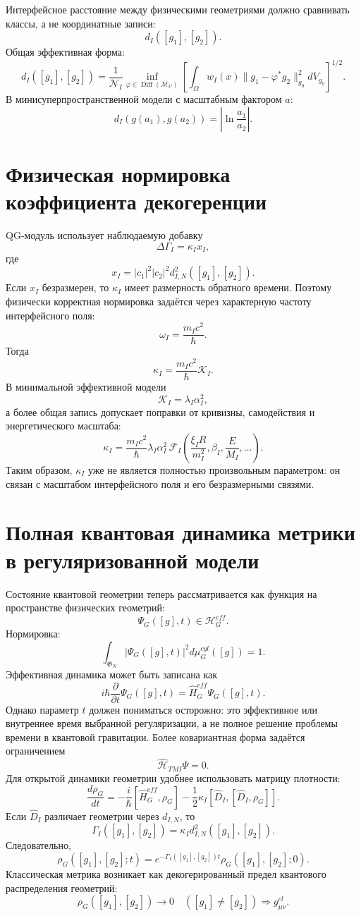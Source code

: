 \documentclass[12pt,a4paper]{article}
\DeclareMathOperator{\Diff}{Diff}
\newcommand{\M}{\mathcal M_U}
\newcommand{\Hilb}{\mathcal H}
\newcommand{\gfrak}{\mathfrak G}
\begin{document}
Интерфейсное расстояние между физическими геометриями должно сравнивать классы, а не координатные записи:
\[
\boxed{d_I([g_1],[g_2]).}
\]
Общая эффективная форма:
\[
\boxed{
d_I([g_1],[g_2])=\frac{1}{\mathcal N_I}\inf_{\varphi\in\Diff(\M)}
\left[\int_\Omega w_I(x)\|g_1-\varphi^*g_2\|_{g_0}^2dV_{g_0}\right]^{1/2}.
}
\]
В минисуперпространственной модели с масштабным фактором $a$:
\[
\boxed{d_I(g(a_1),g(a_2))=\left|\ln\frac{a_1}{a_2}\right|.}
\]

\section{Физическая нормировка коэффициента декогеренции}
QG-модуль использует наблюдаемую добавку
\[
\boxed{\Delta\Gamma_I=\kappa_I x_I,}
\]
где
\[
\boxed{x_I=|c_1|^2|c_2|^2d_{I,N}^2([g_1],[g_2]).}
\]
Если $x_I$ безразмерен, то $\kappa_I$ имеет размерность обратного времени. Поэтому физически корректная нормировка задаётся через характерную частоту интерфейсного поля:
\[
\boxed{\omega_I=\frac{m_Ic^2}{\hbar}.}
\]
Тогда
\[
\boxed{\kappa_I=\frac{m_Ic^2}{\hbar}\mathcal K_I.}
\]
В минимальной эффективной модели
\[
\boxed{\mathcal K_I=\lambda_I\alpha_I^2,}
\]
а более общая запись допускает поправки от кривизны, самодействия и энергетического масштаба:
\[
\boxed{
\kappa_I=\frac{m_Ic^2}{\hbar}\lambda_I\alpha_I^2\,
\mathcal F_I\left(\frac{\xi_I R}{m_I^2},\beta_I,\frac{E}{M_I},\ldots\right).
}
\]
Таким образом, $\kappa_I$ уже не является полностью произвольным параметром: он связан с масштабом интерфейсного поля и его безразмерными связями.

\section{Полная квантовая динамика метрики в регуляризованной модели}
Состояние квантовой геометрии теперь рассматривается как функция на пространстве физических геометрий:
\[
\boxed{\Psi_G([g],t)\in\Hilb_G^{eff}.}
\]
Нормировка:
\[
\boxed{\int_{\gfrak_N}|\Psi_G([g],t)|^2d\mu_G^{cyl}([g])=1.}
\]
Эффективная динамика может быть записана как
\[
\boxed{i\hbar\frac{\partial}{\partial t}\Psi_G([g],t)=\widehat H_G^{eff}\Psi_G([g],t).}
\]
Однако параметр $t$ должен пониматься осторожно: это эффективное или внутреннее время выбранной регуляризации, а не полное решение проблемы времени в квантовой гравитации. Более ковариантная форма задаётся ограничением
\[
\boxed{\widehat{\mathcal H}_{TMI}\Psi=0.}
\]
Для открытой динамики геометрии удобнее использовать матрицу плотности:
\[
\boxed{
\frac{d\rho_G}{dt}=-\frac{i}{\hbar}[\widehat H_G^{eff},\rho_G]
-\frac12\kappa_I[\widehat D_I,[\widehat D_I,\rho_G]].
}
\]
Если $\widehat D_I$ различает геометрии через $d_{I,N}$, то
\[
\boxed{\Gamma_I([g_1],[g_2])=\kappa_I d_{I,N}^2([g_1],[g_2]).}
\]
Следовательно,
\[
\boxed{\rho_G([g_1],[g_2];t)=e^{-\Gamma_I([g_1],[g_2])t}\rho_G([g_1],[g_2];0).}
\]
Классическая метрика возникает как декогерированный предел квантового распределения геометрий:
\[
\boxed{\rho_G([g_1],[g_2])\to0\quad([g_1]\ne[g_2])\Rightarrow g_{\mu\nu}^{cl}.}
\]
\end{document}
